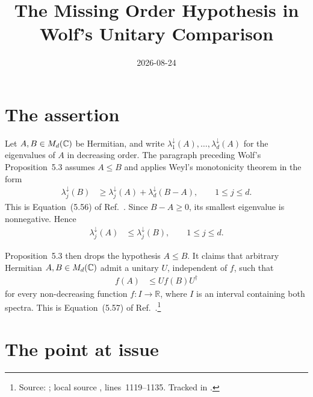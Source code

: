 \documentclass{article}
\title{The Missing Order Hypothesis in Wolf's Unitary Comparison}
\author{}
\date{2026-08-24}
\begin{document}
\maketitle
{}

\section{The assertion}

Let $A,B\in M_{d}(\mathbb{C})$ be Hermitian, and write
$\lambda_1^\downarrow(A),\ldots,\lambda_d^\downarrow(A)$ for the eigenvalues
of $A$ in decreasing order. The paragraph preceding Wolf's Proposition~5.3
assumes $A\leq B$ and applies Weyl's monotonicity theorem in the form
\begin{align}
    \lambda_j^\downarrow(B)
        &\geq \lambda_j^\downarrow(A)
            +\lambda_d^\downarrow(B-A),
        \qquad 1\leq j\leq d.
    \label{eq:wolf_ch5_unitary_comparison_missing_order_weyl_bound}
\end{align}
This is Equation~(5.56) of Ref.~\cite{Wolf2012Quantum}. Since $B-A\geq0$, its
smallest eigenvalue is nonnegative. Hence
\begin{align}
    \lambda_j^\downarrow(A)
        &\leq \lambda_j^\downarrow(B),
        \qquad 1\leq j\leq d.
    \label{eq:wolf_ch5_unitary_comparison_missing_order_ordered_eigenvalue_comparison}
\end{align}

Proposition~5.3 then drops the hypothesis $A\leq B$. It claims that arbitrary
Hermitian $A,B\in M_{d}(\mathbb{C})$ admit a unitary $U$, independent of $f$, such that
\begin{align}
    f(A)
        &\leq U f(B)U^\dagger
    \label{eq:wolf_ch5_unitary_comparison_missing_order_printed_unitary_comparison}
\end{align}
for every non-decreasing function $f:I\to\mathbb R$, where $I$ is an interval
containing both spectra. This is Equation~(5.57) of
Ref.~\cite{Wolf2012Quantum}.\footnote{Source:
    \cite[Proposition~5.3 and Equations~(5.56)--(5.57)]
    {Wolf2012Quantum}; local source
    ,
    lines~1119--1135. Tracked in .}

\section{The point at issue}
\end{document}
